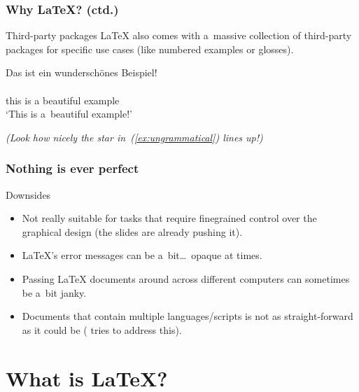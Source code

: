 \documentclass[a4paper,12pt]{beamer}
\begin{document}
\begin{frame}
  \frametitle{Why \LaTeX{}? (ctd.)}

  \begin{block}{Third-party packages}
    \LaTeX{} also comes with a~massive collection of third-party packages for
    specific use cases (like numbered examples or glosses).

    \begin{exe}
      \ex%
      \begin{xlist}
      \end{xlist}
      \ex%
      \glll Das ist ein wunderschönes Beispiel! \\
           \\
      this is a beautiful example \\
      \glt `This is a~beautiful example!'
    \end{exe}

    \emph{\footnotesize%
      (Look how nicely the star in~(\ref{ex:ungrammatical}) lines up!)
    }
  \end{block}
\end{frame}

\begin{frame}
  \frametitle{Nothing is ever perfect}

  \begin{block}{Downsides}
    \begin{itemize}
      \item Not really suitable for tasks that require finegrained control over
        the graphical design (the slides are already pushing it).
      \item \LaTeX{}'s error messages can be a~bit\dots\ opaque at times.
      \item Passing \LaTeX{} documents around across different computers can
        sometimes be a~bit janky.
      \item Documents that contain multiple languages/scripts is not as
        straight-forward as it could be
        ( tries to address this).
    \end{itemize}
  \end{block}
\end{frame}

\section{What is \LaTeX{}?}
\end{document}
